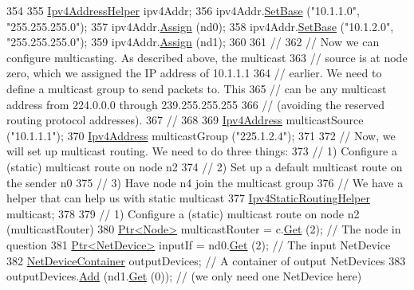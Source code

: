 \begin{DoxyCode}
354 
355   \hyperlink{classns3_1_1Ipv4AddressHelper}{Ipv4AddressHelper} ipv4Addr;
356   ipv4Addr.\hyperlink{classns3_1_1Ipv4AddressHelper_acf7b16dd25bac67e00f5e25f90a9a035}{SetBase} (\textcolor{stringliteral}{"10.1.1.0"}, \textcolor{stringliteral}{"255.255.255.0"});
357   ipv4Addr.\hyperlink{classns3_1_1Ipv4AddressHelper_af8e7f4a1a7e74c00014a1eac445a27af}{Assign} (nd0);
358   ipv4Addr.\hyperlink{classns3_1_1Ipv4AddressHelper_acf7b16dd25bac67e00f5e25f90a9a035}{SetBase} (\textcolor{stringliteral}{"10.1.2.0"}, \textcolor{stringliteral}{"255.255.255.0"});
359   ipv4Addr.\hyperlink{classns3_1_1Ipv4AddressHelper_af8e7f4a1a7e74c00014a1eac445a27af}{Assign} (nd1);
360 
361   \textcolor{comment}{//}
362   \textcolor{comment}{// Now we can configure multicasting.  As described above, the multicast }
363   \textcolor{comment}{// source is at node zero, which we assigned the IP address of 10.1.1.1 }
364   \textcolor{comment}{// earlier.  We need to define a multicast group to send packets to.  This}
365   \textcolor{comment}{// can be any multicast address from 224.0.0.0 through 239.255.255.255}
366   \textcolor{comment}{// (avoiding the reserved routing protocol addresses).}
367   \textcolor{comment}{//}
368 
369   \hyperlink{classns3_1_1Ipv4Address}{Ipv4Address} multicastSource (\textcolor{stringliteral}{"10.1.1.1"});
370   \hyperlink{classns3_1_1Ipv4Address}{Ipv4Address} multicastGroup (\textcolor{stringliteral}{"225.1.2.4"});
371 
372   \textcolor{comment}{// Now, we will set up multicast routing.  We need to do three things:}
373   \textcolor{comment}{// 1) Configure a (static) multicast route on node n2}
374   \textcolor{comment}{// 2) Set up a default multicast route on the sender n0 }
375   \textcolor{comment}{// 3) Have node n4 join the multicast group}
376   \textcolor{comment}{// We have a helper that can help us with static multicast}
377   \hyperlink{classns3_1_1Ipv4StaticRoutingHelper}{Ipv4StaticRoutingHelper} multicast;
378 
379   \textcolor{comment}{// 1) Configure a (static) multicast route on node n2 (multicastRouter)}
380   \hyperlink{classns3_1_1Ptr}{Ptr<Node>} multicastRouter = c.\hyperlink{classns3_1_1NodeContainer_a9ed96e2ecc22e0f5a3d4842eb9bf90bf}{Get} (2);  \textcolor{comment}{// The node in question}
381   \hyperlink{classns3_1_1Ptr}{Ptr<NetDevice>} inputIf = nd0.\hyperlink{classns3_1_1NetDeviceContainer_a677d62594b5c9d2dea155cc5045f4d0b}{Get} (2);  \textcolor{comment}{// The input NetDevice}
382   \hyperlink{classns3_1_1NetDeviceContainer}{NetDeviceContainer} outputDevices;  \textcolor{comment}{// A container of output NetDevices}
383   outputDevices.\hyperlink{classns3_1_1NetDeviceContainer_a7ca8bc1d7ec00fd4fcc63869987fbda5}{Add} (nd1.\hyperlink{classns3_1_1NetDeviceContainer_a677d62594b5c9d2dea155cc5045f4d0b}{Get} (0));  \textcolor{comment}{// (we only need one NetDevice here)}

\end{DoxyCode}
